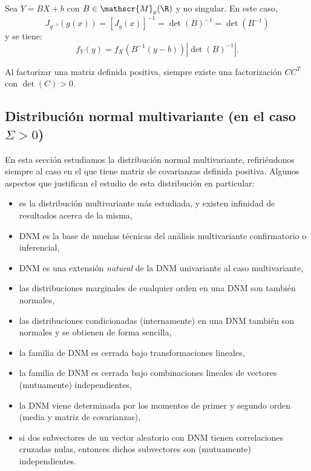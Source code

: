 \begin{ncor} \label{cambiocasolineal}
  Sea $Y = BX + b$ con $B\in \mathscr{M}_{p}(\R)$ y no singular. En este caso,
  \[
  J_{g^{-1}}(g(x)) = \left[ J_{g}(x) \right]^{-1} = \det(B)^{-1} = \det\left(B^{-1}\right)
  \]
  y se tiene:
  \[
  f_Y(y) = f_X\left(B^{-1}(y-b)\right)\left|\det(B)^{-1}\right|
  .\]

\end{ncor}
\begin{nota}
  Al factorizar una matriz definida positiva, siempre existe una factorización $CC^T$ con $\det(C) > 0$.
  \end{nota}

\subsection{Distribución normal multivariante (en el caso $\Sigma > 0$)}
  En esta sección estudiamos la distribución normal multivariante, refiriéndonos siempre al caso en el que tiene matriz de covarianzas definida positiva.
Algunos aspectos que justifican el estudio de esta distribución en particular:
\begin{itemize}
\item es la distribución multivariante más estudiada, y existen infinidad de resultados acerca de la misma,
\item DNM es la base de muchas técnicas del análisis multivariante confirmatorio o inferencial,
\item DNM es una extensión \emph{natural} de la DNM univariante al caso multivariante,
\item las distribuciones marginales de cualquier orden en una DNM son también normales,
\item las distribuciones condicionadas (internamente) en una DNM también son normales y se obtienen de forma sencilla,
\item la familia de DNM es cerrada bajo transformaciones lineales,
\item la familia de DNM es cerrada bajo combinaciones lineales de vectores (mutuamente) independientes,
\item la DNM viene determinada por los momentos de primer y segundo orden (media y matriz de covarianzas),
  \item si dos subvectores de un vector aleatorio con DNM tienen correlaciones cruzadas nulas, entonces dichos subvectores son (mutuamente) independientes.

\end{itemize}



